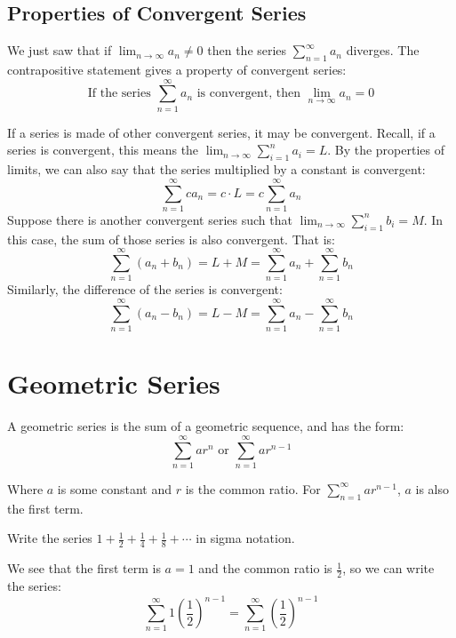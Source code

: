 \subsection{Properties of Convergent Series}
We just saw that if $\lim_{n \to \infty} a_n \neq 0$ then the series $\sum_
{n=1}^\infty a_n$ diverges. The contrapositive statement gives a property of 
convergent series:
$$\text{If the series } \sum_{n=1}^\infty a_n \text{ is convergent, then } 
\lim_{n \to \infty} a_n = 0$$

If a series is made of other convergent series, it may be convergent. Recall, 
if a series is convergent, this means the $\lim_{n \to \infty} \sum_{i=1}^n 
a_i = L$. By the properties of limits, we can also say that the series 
multiplied by a constant is convergent:
$$\sum_{n=1}^\infty ca_n = c \cdot L = c \sum_{n=1}^\infty a_n$$
Suppose there is another convergent series such that $\lim_{n \to \infty} 
\sum_{i=1}^n b_i = M$. In this case, the sum of those series is also convergent. That is:
$$\sum_{n=1}^\infty \left( a_n + b_n \right) = L + M = \sum_{n=1}^\infty a_n + 
\sum_{n=1}^\infty b_n$$
Similarly, the difference of the series is convergent:
$$\sum_{n=1}^\infty \left( a_n - b_n \right) = L - M = \sum_{n=1}^\infty a_n - 
\sum_{n=1}^\infty b_n$$

\section{Geometric Series}

A geometric series is the sum of a geometric sequence, and has the form:
$$\sum_{n=1}^\infty ar^n \text{ or } \sum_{n=1}^\infty ar^{n-1}$$ 

Where $a$ is some constant and $r$ is the common ratio. For $\sum_{n=1}^\infty 
ar^{n-1}$, $a$ is also the first term. 

\begin{Worked}
\begin{Problem}
Write the series $1 + \frac{1}{2} + \frac{1}{4} + 
\frac{1}{8} + \cdots$ in sigma notation.
\end{Problem}
\begin{Solution}
We see that the first term is $a=1$ and the common ratio is 
$\frac{1}{2}$, so we can write the series: $$\sum_{n=1}^\infty 1(\frac{1}{2})^
{n-1} = \sum_{n=1}^\infty (\frac{1}{2})^{n-1}$$
\end{Solution}
\end{Worked}

